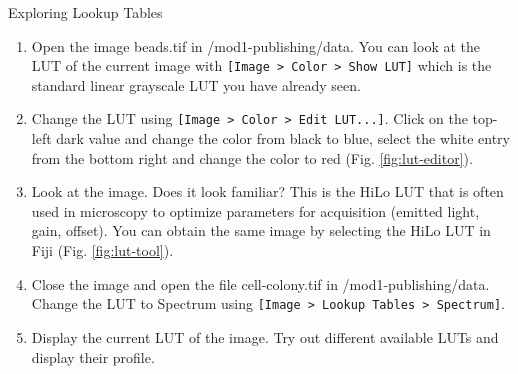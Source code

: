 \begin{taskbox}{Exploring Lookup Tables}

\begin{enumerate}
	\item Open the image beads.tif in /mod1-publishing/data. You can look at the LUT of the current image with \texttt{[Image > Color > Show LUT]} which is the standard linear grayscale LUT you have already seen.
	\item Change the LUT using \texttt{[Image > Color > Edit LUT...]}. Click on the top-left dark value and change the color from black to blue,  select the white entry from the bottom right and change the color to red (Fig. \ref{fig:lut-editor}).
	
	\begin{minipage}[t]{\linewidth}
		\begin{center}
		\medskip
		\label{fig:lut-editor}
		\end{center}
	\end{minipage}
	
	\item Look at the image. Does it look familiar? This is the HiLo LUT that is often used in microscopy to optimize parameters for acquisition (emitted light, gain, offset). You can obtain the same image by selecting the HiLo LUT in Fiji (Fig. \ref{fig:lut-tool}).
	
	\begin{minipage}[t]{\linewidth}
		\begin{center}
		\medskip
		\label{fig:lut-tool}
		\end{center}
	\end{minipage}
	
	\item Close the image and open the file cell-colony.tif in /mod1-publishing/data. Change the LUT to Spectrum using \texttt{[Image > Lookup Tables > Spectrum]}.
	\item Display the current LUT of the image. Try out different available LUTs and display their profile.
\end{enumerate}

\end{taskbox}

